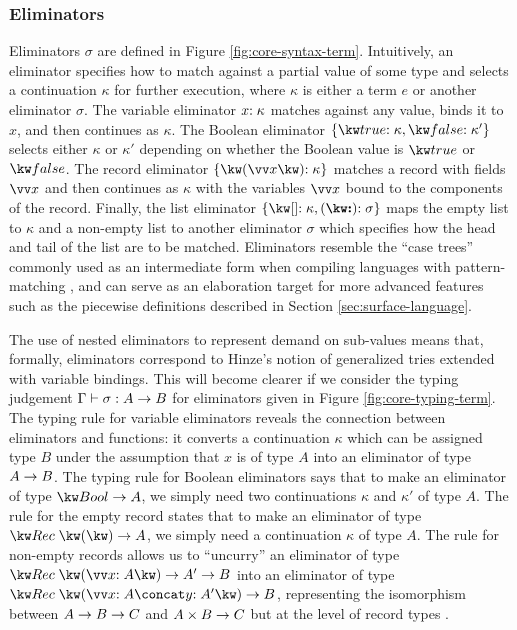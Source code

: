 

\noindent

\subsubsection{Eliminators}
\label{sec:core-language:syntax-eliminator}
Eliminators $\sigma$ are defined in Figure \ref{fig:core-syntax-term}. Intuitively, an eliminator specifies how to match against a partial value of some type and selects a continuation $\kappa$ for further execution, where $\kappa$ is either a term $e$ or another eliminator $\sigma$. The variable eliminator ${x}{:}\;{\kappa}$ matches against any value, binds it to $x$, and then continues as $\kappa$. The Boolean eliminator $\elimBool{\kappa}{\kappa'}$ selects either $\kappa$ or $\kappa'$ depending on whether the Boolean value is $\exTrue$ or $\exFalse$. The record eliminator $\elimRec{\seq{x}}{\kappa}$ matches a record with fields $\seq{x}$ and then continues as $\kappa$ with the variables $\seq{x}$ bound to the components of the record. Finally, the list eliminator $\elimList{\kappa}{\sigma}$ maps the empty list to $\kappa$ and a non-empty list to another eliminator $\sigma$ which specifies how the head and tail of the list are to be matched. Eliminators resemble the ``case trees'' commonly used as an intermediate form when compiling languages with pattern-matching \cite{graf20}, and can serve as an elaboration target for more advanced features such as the piecewise definitions described in Section \ref{sec:surface-language}.

The use of nested eliminators to represent demand on sub-values means that, formally, eliminators correspond to Hinze's notion of generalized tries \cite{hinze00} extended with variable bindings. This will become clearer if we consider the typing judgement $\Gamma \vdash \sigma: {A}\rightarrow{B}$ for eliminators given in Figure \ref{fig:core-typing-term}. The typing rule for variable eliminators reveals the connection between eliminators and functions: it converts a continuation $\kappa$ which can be assigned type $B$ under the assumption that $x$ is of type $A$ into an eliminator of type ${A}\rightarrow{B}$. The typing rule for Boolean eliminators says that to make an eliminator of type $\tyFun{\tyBool}{A}$, we simply need two continuations $\kappa$ and $\kappa'$ of type $A$. The rule for the empty record states that to make an eliminator of type $\tyFun{\tyRec{}}{A}$, we simply need a continuation $\kappa$ of type $A$. The rule for non-empty records allows us to ``uncurry'' an eliminator of type $\tyFun{\tyRec{\vec{\bind{x}{A}}}}{\tyFun{A'}{B}}$ into an eliminator of type $\tyFun{\tyRec{\vec{\bind{x}{A}} \concat \bind{y}{A'}}}{B}$, representing the isomorphism between ${{A}\rightarrow{B}}\rightarrow{C}$ and ${{A}\times{B}}\rightarrow{C}$ but at the level of record types \cite{hinze00}.

